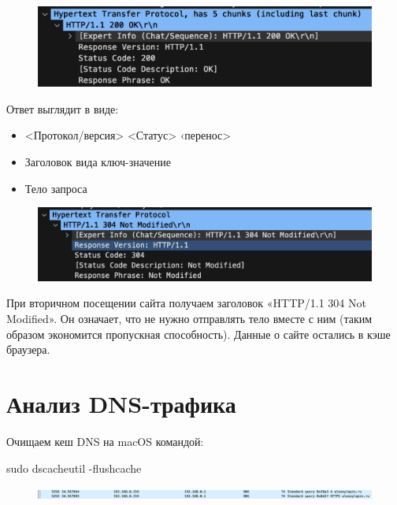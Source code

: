 \documentclass[12pt,onecolumn]{article}
\begin{document}
\begin{itemize}
    \begin{figure}[H]
        \centering
        \includegraphics*[width=\textwidth]{image/part3/http-response.png}
    \end{figure}
    Ответ выглядит в виде:
    \begin{itemize}
        \item <Протокол/версия> <Статус> ‹перенос>
        \item Заголовок вида ключ-значение
        \item Тело запроса
    \end{itemize}
    \begin{figure}[H]
        \centering
        \includegraphics*[width=\textwidth]{image/part3/304.png}
    \end{figure}
    При вторичном посещении сайта получаем заголовок «HTTP/1.1 304 Not Modified». Он означает, что не нужно отправлять тело вместе с
ним (таким образом экономится пропускная способность). Данные о сайте остались в кэше браузера.

\end{itemize}

\section{Анализ DNS-трафика}
Очищаем кеш DNS на macOS командой:

sudo dscacheutil -flushcache

\begin{figure}[H]
    \centering
    \includegraphics*[width=\textwidth]{image/part4/dns.png}
\end{figure}
\end{document}
